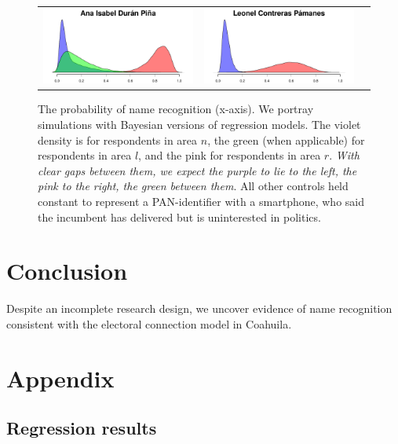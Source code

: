 \documentclass[letter,12pt]{article}
\begin{document}
\begin{figure}
\begin{tabular}{ccc}
    \includegraphics[width=.3\columnwidth]{../graphs/prReconoce4.pdf} &
    \includegraphics[width=.3\columnwidth]{../graphs/prReconoce9.pdf} \\
  \end{tabular}
  \caption{The probability of name recognition (x-axis). We portray simulations with Bayesian versions of regression models. The violet density is for respondents in area $n$, the green (when applicable) for respondents in area $l$, and the pink for respondents in area $r$. \emph{With clear gaps between them, we expect the purple to lie to the left, the pink to the right, the green between them}. All other controls held constant to represent a PAN-identifier with a smartphone, who said the incumbent has delivered but is uninterested in politics.}\label{f:sims}
\end{figure}

\section{Conclusion}

Despite an incomplete research design, we uncover evidence of name recognition consistent with the electoral connection model in Coahuila. 





\section*{Appendix}
\subsection{Regression results}
\end{document}
